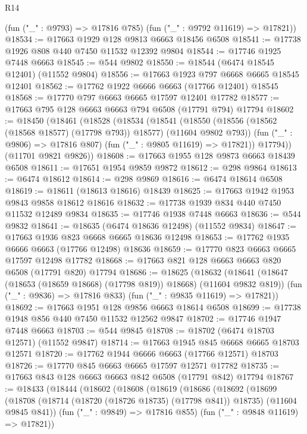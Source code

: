 \begin{lexlean}{R14}
\begin{coremodule}
{{{{{{{{{{{{{{{{{{{{{{{{{{{{{{{{{{{{{{{{{{{{{{{{{{{{{{{{{{{{{{{{{{{{{{{{{{{{{{{{{{      (fun ("_" : @9793) => @17816 @785)
      (fun ("_" : @9792 @11619) => @17821))
@18534 := @17663 @1929 @128 @9813 @6663 @18456 @6508
@18541 := @17738 @1926 @808 @440 @7450 @11532 @12392 @9804
@18544 := @17746 @1925 @7448 @6663
@18545 := @544 @9802
@18550 := @18544 (@6474 @18545 @12401) (@11552 @9804)
@18556 := @17663 @1923 @797 @6668 @6665 @18545 @12401
@18562 := @17762 @1922 @6666 @6663 (@17766 @12401) @18545
@18568 := @17770 @797 @6663 @6665 @17597 @12401 @17782
@18577 := @17663 @795 @128 @6663 @6663 @794 @6508 (@17791 @794) @17794
@18602 := @18450
    (@18461
      (@18528
        (@18534
          (@18541
            (@18550 (@18556 (@18562 (@18568 @18577) (@17798 @793)) @18577) (@11604 @9802 @793))
            (fun ("_" : @9806) => @17816 @807)
            (fun ("_" : @9805 @11619) => @17821))
          @17794))
      (@11701 @9821 @9826))
@18608 := @17663 @1955 @128 @9873 @6663 @18439 @6508
@18611 := @17651 @1954 @9859 @9872
@18612 := @298 @9864
@18613 := @6474 @18612
@18614 := @298 @9869
@18616 := @6474 @18614 @6508
@18619 := @18611 (@18613 @18616) @18439
@18625 := @17663 @1942 @1953 @9843 @9858 @18612 @18616
@18632 := @17738 @1939 @834 @440 @7450 @11532 @12489 @9834
@18635 := @17746 @1938 @7448 @6663
@18636 := @544 @9832
@18641 := @18635 (@6474 @18636 @12498) (@11552 @9834)
@18647 := @17663 @1936 @823 @6668 @6665 @18636 @12498
@18653 := @17762 @1935 @6666 @6663 (@17766 @12498) @18636
@18659 := @17770 @823 @6663 @6665 @17597 @12498 @17782
@18668 := @17663 @821 @128 @6663 @6663 @820 @6508 (@17791 @820) @17794
@18686 := @18625
    (@18632
      (@18641 (@18647 (@18653 (@18659 @18668) (@17798 @819)) @18668) (@11604 @9832 @819))
      (fun ("_" : @9836) => @17816 @833)
      (fun ("_" : @9835 @11619) => @17821))
@18692 := @17663 @1951 @128 @9856 @6663 @18614 @6508
@18699 := @17738 @1948 @856 @440 @7450 @11532 @12562 @9847
@18702 := @17746 @1947 @7448 @6663
@18703 := @544 @9845
@18708 := @18702 (@6474 @18703 @12571) (@11552 @9847)
@18714 := @17663 @1945 @845 @6668 @6665 @18703 @12571
@18720 := @17762 @1944 @6666 @6663 (@17766 @12571) @18703
@18726 := @17770 @845 @6663 @6665 @17597 @12571 @17782
@18735 := @17663 @843 @128 @6663 @6663 @842 @6508 (@17791 @842) @17794
@18767 := @18433
    (@18444
      (@18602
        (@18608
          (@18619
            (@18686
              (@18692
                (@18699
                  (@18708
                    (@18714 (@18720 (@18726 @18735) (@17798 @841)) @18735)
                    (@11604 @9845 @841))
                  (fun ("_" : @9849) => @17816 @855)
                  (fun ("_" : @9848 @11619) => @17821))
}}}}}}}}}}}}}}}}}}}}}}}}}}}}}}}}}}}}}}}}}}}}}}}}}}}}}}}}}}}}}}}}}}}}}}}}}}}}}}}}}}
\end{coremodule}
\end{lexlean}
